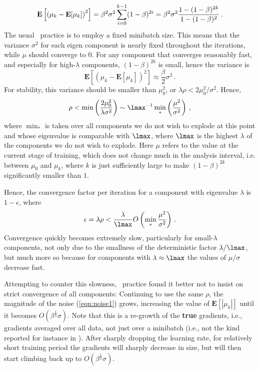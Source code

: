 \documentclass{article} %
\begin{document}
\begin{equation}
\mathbf E \left [\left(\mu_k - \mathbf E [\mu_k] \right)^2 \right ] =
\beta^2\sigma^2 \sum_{i=0}^{k-1} (1-\beta)^{2i} \\ =
\beta^2\sigma^2\frac{1-(1-\beta)^{2k}}{1-(1-\beta)^2}\,.
\label{eqn:noise1}
\end{equation}
The usual \SGD~practice is to employ a fixed minibatch size. This means that the variance $\sigma^2$ for each eigen component is nearly fixed throughout the iterations, while $\mu$ should converge to $0$. For any component that converges reasonably fast, and especially for high-$\lambda$ components, $(1 - \beta)^{2k}$ is small, hence the variance is
\begin{equation}
\mathbf E \left [\left(\mu_k - \mathbf E [\mu_k] \right)^2 \right ] \approx \frac{\beta}{2} \sigma^2\,.
\end{equation}
For stability, this variance should be smaller than $\mu_0^2$, or $\lambda \rho < 2 \mu_0^2/\sigma^2$. Hence,
$$
	\rho < \min \left( \frac{2 \mu_0^2}{\lambda \sigma^2} \right) \sim
	\lmax^{-1} \min_* \left( \frac{\mu^2}{\sigma^2} \right)\,,
$$
where $\min_*$ is taken over all components we do not wish to explode at this point and whose eigenvalue is comparable with $\lmax$, where $\lmax$ is the highest $\lambda$ of the components we do not wish to explode. Here $\mu$ refers to the value at the current stage of training, which does not change much in the analysis interval, i.e. between $\mu_0$ and $\mu_k$, where $k$ is just sufficiently large to make $(1 - \beta)^{2k}$ significantly smaller than $1$.

Hence, the convergence factor per iteration for a component with eigenvalue $\lambda$ is $1 - \epsilon$, where
\begin{equation}
  \epsilon = \lambda \rho < \frac{\lambda}{\lmax} O\left( \min_* \frac{\mu^2}{\sigma^2} \right)\,.
  \label{eqn:convrate1}
\end{equation}
Convergence quickly becomes extremely slow, particularly for small-$\lambda$ components, not only due to the smallness of the deterministic factor $\lambda/\lmax$, but much more so because for components with $\lambda \approx \lmax$ the values of $\mu / \sigma$ decrease fast.

Attempting to counter this slowness, \SGD~practice found it better not to insist on strict convergence of all components: Continuing to use the same $\rho$, the magnitude of the noise (\ref{eqn:noise1}) grows, increasing the value of $\mathbf E[|\mu_k|]$ until it becomes $O(\beta^{\frac12}\sigma)$. Note that this is a re-growth of the \textbf{true} gradients, i.e., gradients averaged over all data, not just over a minibatch (i.e., not the kind reported for instance in \cite[Fig.~8.1]{Goodfellow-et-al-2016}). After sharply dropping the learning rate, for relatively short training period the gradients will sharply decrease in size, but will then start climbing back up to $O(\beta^{\frac12} \sigma)$.
\end{document}
